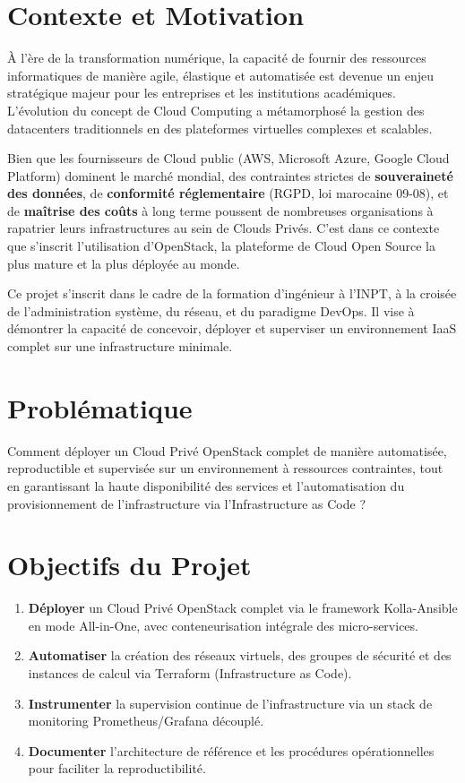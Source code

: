 \documentclass[12pt,a4paper,oneside]{book}
\begin{document}
\section{Contexte et Motivation}

\`A l'\`ere de la transformation num\'erique, la capacit\'e de fournir des ressources informatiques de mani\`ere agile, \'elastique et automatis\'ee est devenue un enjeu strat\'egique majeur pour les entreprises et les institutions acad\'emiques. L'\'evolution du concept de Cloud Computing a m\'etamorphos\'e la gestion des datacenters traditionnels en des plateformes virtuelles complexes et scalables.

Bien que les fournisseurs de Cloud public (AWS, Microsoft Azure, Google Cloud Platform) dominent le march\'e mondial, des contraintes strictes de \textbf{souverainet\'e des donn\'ees}, de \textbf{conformit\'e r\'eglementaire} (RGPD, loi marocaine 09-08), et de \textbf{ma\^itrise des co\^uts} \`a long terme poussent de nombreuses organisations \`a rapatrier leurs infrastructures au sein de Clouds Priv\'es. C'est dans ce contexte que s'inscrit l'utilisation d'OpenStack, la plateforme de Cloud Open Source la plus mature et la plus d\'eploy\'ee au monde.

Ce projet s'inscrit dans le cadre de la formation d'ing\'enieur \`a l'INPT, \`a la crois\'ee de l'administration syst\`eme, du r\'eseau, et du paradigme DevOps. Il vise \`a d\'emontrer la capacit\'e de concevoir, d\'eployer et superviser un environnement IaaS complet sur une infrastructure minimale.

\section{Probl\'ematique}

Comment d\'eployer un Cloud Priv\'e OpenStack complet de mani\`ere automatis\'ee, reproductible et supervis\'ee sur un environnement \`a ressources contraintes, tout en garantissant la haute disponibilit\'e des services et l'automatisation du provisionnement de l'infrastructure via l'Infrastructure as Code ?

\section{Objectifs du Projet}

\begin{enumerate}[leftmargin=2cm]
    \item \textbf{D\'eployer} un Cloud Priv\'e OpenStack complet via le framework Kolla-Ansible en mode All-in-One, avec conteneurisation int\'egrale des micro-services.
    \item \textbf{Automatiser} la cr\'eation des r\'eseaux virtuels, des groupes de s\'ecurit\'e et des instances de calcul via Terraform (Infrastructure as Code).
    \item \textbf{Instrumenter} la supervision continue de l'infrastructure via un stack de monitoring Prometheus/Grafana d\'ecoupl\'e.
    \item \textbf{Documenter} l'architecture de r\'ef\'erence et les proc\'edures op\'erationnelles pour faciliter la reproductibilit\'e.
\end{enumerate}
\end{document}
